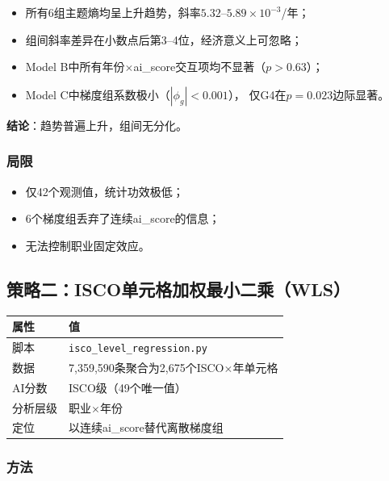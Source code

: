\documentclass[12pt,a4paper]{ctexart}
\begin{document}
\begin{resultbox}[策略一：结果]
\begin{itemize}
\item 所有6组主题熵均呈上升趋势，斜率$5.32$--$5.89 \times 10^{-3}$/年；
\item 组间斜率差异在小数点后第3--4位，经济意义上可忽略；
\item Model B中所有年份$\times$ai\_score交互项均不显著（$p>0.63$）；
\item Model C中梯度组系数极小（$|\phi_g| < 0.001$），
      仅G4在$p=0.023$边际显著。
\end{itemize}
\textbf{结论}：趋势普遍上升，组间无分化。
\end{resultbox}

\subsubsection{局限}

\begin{itemize}
\item 仅42个观测值，统计功效极低；
\item 6个梯度组丢弃了连续ai\_score的信息；
\item 无法控制职业固定效应。
\end{itemize}


\subsection{策略二：ISCO单元格加权最小二乘（WLS）}
\label{subsec:isco_wls}

\begin{table}[h!]
\centering
\small
\begin{tabular}{ll}
\toprule
\textbf{属性} & \textbf{值} \\
\midrule
脚本 & \texttt{isco\_level\_regression.py} \\
数据 & 7,359,590条聚合为2,675个ISCO$\times$年单元格 \\
AI分数 & ISCO级（49个唯一值） \\
分析层级 & 职业$\times$年份 \\
定位 & 以连续ai\_score替代离散梯度组 \\
\bottomrule
\end{tabular}
\end{table}

\subsubsection{方法}
\end{document}
